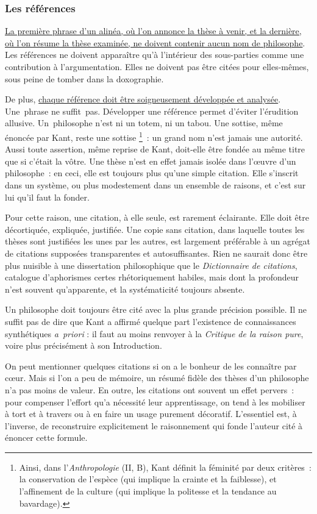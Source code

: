\documentclass[a4paper,12pt]{article}
\begin{document}
\subsubsection{Les références}
\label{sec:orga77a960}

\uline{La première phrase d'un alinéa, où l'on annonce la thèse à venir, et la
dernière, où l'on résume la thèse examinée, ne doivent contenir aucun
nom de philosophe}. Les références ne doivent apparaître qu'à
l'intérieur des sous-parties comme une contribution à l'argumentation.
Elles ne doivent pas être citées pour elles-mêmes, sous peine de tomber
dans la doxographie.

De plus, \uline{chaque référence doit être soigneusement développée et
analysée}. Une phrase ne suffit pas. Développer une référence permet
d'éviter l'érudition allusive. Un philosophe n'est ni un totem, ni un
tabou. Une sottise, même énoncée par Kant, reste une sottise \footnote{Ainsi, dans l'\emph{Anthropologie} (II, B), Kant définit la féminité par
deux critères : la conservation de l'espèce (qui implique la crainte
et la faiblesse), et l'affinement de la culture (qui implique la
politesse et la tendance au bavardage).} : un
grand nom n'est jamais une autorité. Aussi toute assertion, même reprise
de Kant, doit-elle être fondée au même titre que si c'était la vôtre.
Une thèse n'est en effet jamais isolée dans l'œuvre d'un philosophe : en
ceci, elle est toujours plus qu'une simple citation. Elle s'inscrit dans
un système, ou plus modestement dans un ensemble de raisons, et c'est
sur lui qu'il faut la fonder.

Pour cette raison, une citation, à elle seule, est rarement éclairante.
Elle doit être décortiquée, expliquée, justifiée. Une copie sans
citation, dans laquelle toutes les thèses sont justifiées les unes par
les autres, est largement préférable à un agrégat de citations supposées
transparentes et autosuffisantes. Rien ne saurait donc être plus
nuisible à une dissertation philosophique que le \emph{Dictionnaire de
citations}, catalogue d'aphorismes certes rhétoriquement habiles, mais
dont la profondeur n'est souvent qu'apparente, et la systématicité
toujours absente.

Un philosophe doit toujours être cité avec la plus grande précision
possible. Il ne suffit pas de dire que Kant a affirmé quelque part
l'existence de connaissances synthétiques \emph{a priori} : il faut au moins
renvoyer à la \emph{Critique de la raison pure}, voire plus précisément à son
Introduction.

On peut mentionner quelques citations si on a le bonheur de les
connaître par cœur. Mais si l'on a peu de mémoire, un résumé fidèle des
thèses d'un philosophe n'a pas moins de valeur. En outre, les citations
ont souvent un effet pervers : pour compenser l'effort qu'a nécessité
leur apprentissage, on tend à les mobiliser à tort et à travers ou à en
faire un usage purement décoratif. L'essentiel est, à l'inverse, de
reconstruire explicitement le raisonnement qui fonde l'auteur cité à
énoncer cette formule.
\end{document}
